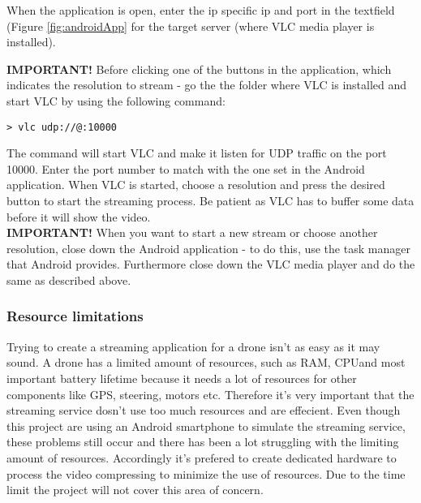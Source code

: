 
When the application is open, enter the ip specific ip and port in the textfield (Figure \ref{fig:androidApp} for the target server (where VLC media player is installed).


\textbf{IMPORTANT!} Before clicking one of the buttons in the application, which indicates the resolution to stream - go the the folder where VLC is installed and start VLC by using the following command:

\begin{verbatim}
> vlc udp://@:10000
\end{verbatim}

The command will start VLC and make it listen for UDP traffic on the port 10000. Enter the port number to match with the one set in the Android application.
When VLC is started, choose a resolution and press the desired button to start the streaming process. Be patient as VLC has to buffer some data before it will show the video.\\

\textbf{IMPORTANT!} When you want to start a new stream or choose another resolution, close down the Android application - to do this, use the task manager that Android provides. Furthermore close down the VLC media player and do the same as described above.

\subsubsection{Resource limitations}
Trying to create a streaming application for a drone isn't as easy as it may sound. A drone has a limited amount of resources, such as RAM, CPUand most important battery lifetime because it needs a lot of resources for other components like GPS, steering, motors etc. Therefore it's very important that the streaming service dosn't use too much resources and are effecient. Even though this project are using an Android smartphone to simulate the streaming service, these problems still occur and there has been a lot struggling with the limiting amount of resources. Accordingly it's prefered to create dedicated hardware to process the video compressing to minimize the use of resources. Due to the time limit the project will not cover this area of concern.

